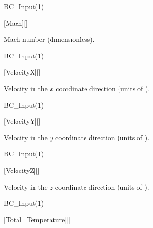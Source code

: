 
\begin{nmldescitem}
BC_Input(1)%
\end{nmldescitem}
[Mach][]

\begin{nmldescbody}
Mach number (dimensionless).
\end{nmldescbody}


\begin{nmldescitem}
BC_Input(1)%
\end{nmldescitem}
[VelocityX][]

\begin{nmldescbody}
Velocity in the $x$ coordinate direction (units of \unitVel{}).
\end{nmldescbody}


\begin{nmldescitem}
BC_Input(1)%
\end{nmldescitem}
[VelocityY][]

\begin{nmldescbody}
Velocity in the $y$ coordinate direction (units of \unitVel{}).
\end{nmldescbody}


\begin{nmldescitem}
BC_Input(1)%
\end{nmldescitem}
[VelocityZ][]

\begin{nmldescbody}
Velocity in the $z$ coordinate direction (units of \unitVel{}).
\end{nmldescbody}


\begin{nmldescitem}
BC_Input(1)%
\end{nmldescitem}
[Total\_Temperature][]


